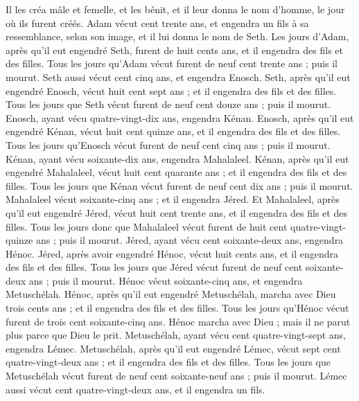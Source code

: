 \begin{multicols}{2}
Il les créa mâle et femelle, et les bénit, et il leur donna le nom d'homme, le jour où ils furent créés.
Adam vécut cent trente ans, et engendra un fils à sa ressemblance, selon son image, et il lui donna le nom de Seth.
Les jours d'Adam, après qu'il eut engendré Seth, furent de huit cents ans, et il engendra des fils et des filles.
Tous les jours qu'Adam vécut furent de neuf cent trente ans ; puis il mourut.
Seth aussi vécut cent cinq ans, et engendra Enosch.
Seth, après qu'il eut engendré Enosch, vécut huit cent sept ans ; et il engendra des fils et des filles.
Tous les jours que Seth vécut furent de neuf cent douze ans ; puis il mourut.
Enosch, ayant vécu quatre-vingt-dix ans, engendra Kénan.
Enosch, après qu'il eut engendré Kénan, vécut huit cent quinze ans, et il engendra des fils et des filles.
Tous les jours qu'Enosch vécut furent de neuf cent cinq ans ; puis il mourut.
Kénan, ayant vécu soixante-dix ans, engendra Mahalaleel.
Kénan, après qu'il eut engendré Mahalaleel, vécut huit cent quarante ans ; et il engendra des fils et des filles.
Tous les jours que Kénan vécut furent de neuf cent dix ans ; puis il mourut.
Mahalaleel vécut soixante-cinq ans ; et il engendra Jéred.
Et Mahalaleel, après qu'il eut engendré Jéred, vécut huit cent trente ans, et il engendra des fils et des filles.
Tous les jours donc que Mahalaleel vécut furent de huit cent quatre-vingt-quinze ans ; puis il mourut.
Jéred, ayant vécu cent soixante-deux ans, engendra Hénoc.
Jéred, après avoir engendré Hénoc, vécut huit cents ans, et il engendra des fils et des filles.
Tous les jours que Jéred vécut furent de neuf cent soixante-deux ans ; puis il mourut.
Hénoc vécut soixante-cinq ans, et engendra Metuschélah.
Hénoc, après qu'il eut engendré Metuschélah, marcha avec Dieu trois cents ans ; et il engendra des fils et des filles.
Tous les jours qu'Hénoc vécut furent de trois cent soixante-cinq ans.
Hénoc marcha avec Dieu ; mais il ne parut plus parce que Dieu le prit.
Metuschélah, ayant vécu cent quatre-vingt-sept ans, engendra Lémec.
Metuschélah, après qu'il eut engendré Lémec, vécut sept cent quatre-vingt-deux ans ; et il engendra des fils et des filles.
Tous les jours que Metuschélah vécut furent de neuf cent soixante-neuf ans ; puis il mourut.
Lémec aussi vécut cent quatre-vingt-deux ans, et il engendra un fils.

\end{multicols}
